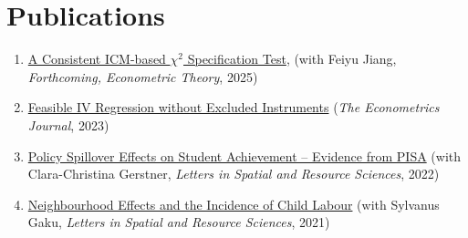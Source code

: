 \documentclass[12pt,letterpaper]{article}
\begin{document}
\section*{Publications}
\begin{enumerate}
  \item \href{https://arxiv.org/pdf/2208.13370.pdf}{A Consistent ICM-based $\chi^2$ Specification Test}, (with Feiyu Jiang, \textit{Forthcoming, Econometric Theory}, 2025) 
  
  \item \href{https://academic.oup.com/ectj/advance-article-abstract/doi/10.1093/ectj/utac032/6888009?redirectedFrom=fulltext}{Feasible IV Regression without Excluded Instruments} (\textit{The Econometrics Journal}, 2023)
  
  \item \href{https://link.springer.com/article/10.1007/s12076-022-00310-y}{Policy Spillover Effects on Student Achievement – Evidence from PISA} (with Clara-Christina Gerstner, \textit{Letters in Spatial and Resource Sciences}, 2022) 
  
	\item \href{https://link.springer.com/article/10.1007/s12076-021-00276-3}{Neighbourhood Effects and the Incidence of Child Labour} (with Sylvanus Gaku, \textit{Letters in Spatial and Resource Sciences}, 2021)
\end{enumerate}
\end{document}
